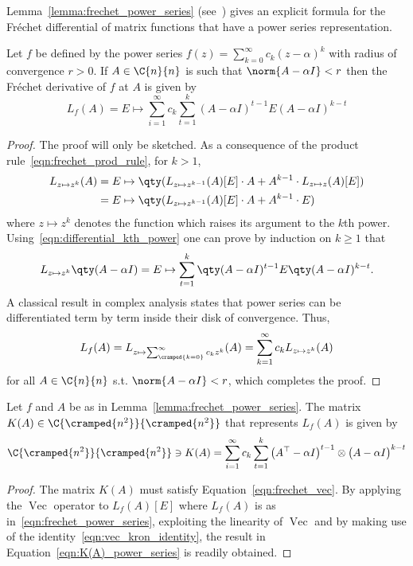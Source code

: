 Lemma~\ref{lemma:frechet_power_series} (see~\cite[Problem~3.6]{higham:matfun_book}) gives an explicit formula for the Fréchet differential of matrix functions that have a power series representation.
\begin{lemma}\label{lemma:frechet_power_series}
	Let $f$ be defined by the power series $f(z)=\sum_{k=0}^{\infty}c_k(z-\alpha)^k$ with radius of convergence $r>0$. If $A\in\C{n}{n}$ is such that $\norm{A-\alpha I}<r$ then the Fréchet derivative of $f$ at $A$ is given by
	\begin{equation}\label{eqn:frechet_power_series}
		L_f(A) = E\mapsto\sum_{i=1}^{\infty}c_k\sum_{t=1}^k(A-\alpha I)^{t-1}E(A-\alpha I)^{k-t}
	\end{equation}
\end{lemma}
\begin{proof}
	The proof will only be sketched.
	As a consequence of the product rule~\eqref{eqn:frechet_prod_rule}, for $k>1$,
	\begin{equation}\label{eqn:differential_kth_power}
	\begin{aligned}
		L_{z\mapsto z^k}(A) & = E\mapsto\qty(L_{z\mapsto z^{k-1}}(A)[E]\cdot A+A^{k-1}\cdot L_{z\mapsto z}(A)[E])\\
		 & = E\mapsto\qty(L_{z\mapsto z^{k-1}}(A)[E]\cdot A+A^{k-1}\cdot E)
	\end{aligned}
	\end{equation}
	where $z\mapsto z^{k}$ denotes the function which raises its argument to the $k$th power.
	Using~\eqref{eqn:differential_kth_power} one can prove by induction on $k\ge 1$ that 
	\[
		L_{z\mapsto z^k}\qty(A-\alpha I) = E\mapsto\sum_{t=1}^k\qty(A-\alpha I)^{t-1}E\qty(A-\alpha I)^{k-t}.
	\]	
	A classical result in complex analysis states that power series can be differentiated term by term inside their disk of convergence. Thus,
	\[
		L_f(A) = L_{z\mapsto\sum_{\cramped{k=0}}^{\infty} c_kz^k}(A) =  \sum_{k=1}^{\infty}c_k L_{z\mapsto z^k}(A)
	\]
	for all $A\in\C{n}{n}$ s.t. $\norm{A-\alpha I}<r$, which completes the proof.
\end{proof}
\begin{corollario_lemma}\label{cor:K(A)_power_series}
	Let $f$ and $A$ be as in Lemma~\ref{lemma:frechet_power_series}. The matrix $K(A)\in\C{\cramped{n^2}}{\cramped{n^2}}$ that represents $L_f(A)$ is given by
	\begin{equation}\label{eqn:K(A)_power_series}
		\C{\cramped{n^2}}{\cramped{n^2}}\ni K(A)=\sum_{i=1}^{\infty}c_k\sum_{t=1}^k\big(A^{\top}-\alpha I\big)^{{t-1}}\otimes\big(A-\alpha I\big)^{k-t}
	\end{equation}
\end{corollario_lemma}
\begin{proof}
	The matrix $K(A)$ must satisfy Equation~\eqref{eqn:frechet_vec}. By applying the $\operatorname{Vec}$ operator to $L_f(A)[E]$ where $L_f(A)$ is as in~\eqref{eqn:frechet_power_series}, exploiting the linearity of $\operatorname{Vec}$ and by making use of the identity~\eqref{eqn:vec_kron_identity}, the result in Equation~\eqref{eqn:K(A)_power_series} is readily obtained.
\end{proof}

